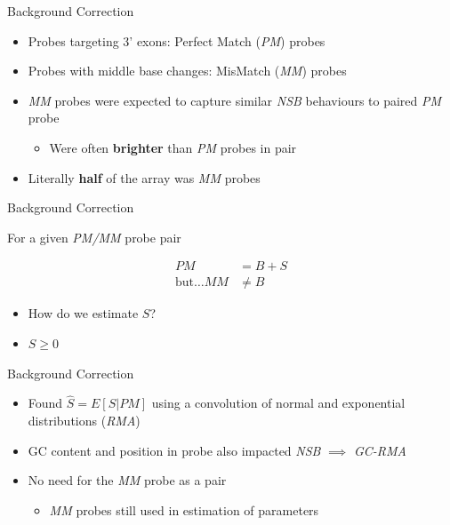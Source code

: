 \documentclass[aspectratio=169,11pt]{beamer}
\begin{document}
\begin{frame}{Background Correction}

	\begin{itemize}
		\item Probes targeting 3' exons: Perfect Match (\textit{PM}) probes
		\item Probes with middle base changes: MisMatch (\textit{MM}) probes
		\item \textit{MM} probes were expected to capture similar \textit{NSB} behaviours to paired \textit{PM} probe
		\begin{itemize}
			\item Were often \textbf{brighter} than \textit{PM} probes in pair
		\end{itemize}
		\item Literally \textbf{half} of the array was \textit{MM} probes
	\end{itemize}
	
\end{frame}

\begin{frame}{Background Correction}

For a given \textit{PM/MM} probe pair

	\begin{align*}
		PM &= B + S\\[3mm]
		\text{but}\ldots MM &\neq B
	\end{align*}
	
	\begin{itemize}
		\item How do we estimate $S$?
		\item $S \geq 0$	
	\end{itemize}


\end{frame}

\begin{frame}{Background Correction}

	\begin{itemize}
		\item Found $\hat{S} = E[S|PM]$ using a convolution of normal and exponential distributions (\textit{RMA})
		\item GC content and position in probe also impacted \textit{NSB} $\implies$ \textit{GC-RMA}
		\item No need for the \textit{MM} probe as a pair
		\begin{itemize}
			\item \textit{MM} probes still used in estimation of parameters
		\end{itemize}
	\end{itemize}
	
\end{frame}
\end{document}

